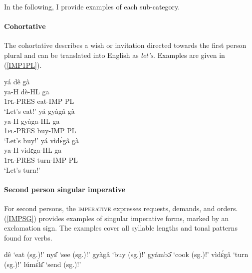 
\noindent In the following, I provide examples of each sub-category.

\paragraph{Cohortative}
The cohortative describes a wish or invitation directed towards the first person plural and can be translated into English as {\itshape let's}. Examples are given in (\ref{IMP1PL}).

\begin{exe}
\ex\label{IMP1PL}
\begin{xlist}
\ex 
  \glll yá dê gà \\
         ya-H dè-HL ga \\
         1\textsc{pl}-PRES eat-IMP PL\\
    \trans `Let's eat!' 
\ex 
  \glll yá gyàgâ gà \\
         ya-H gyàga-HL ga \\
         1\textsc{pl}-PRES buy-IMP PL\\
    \trans `Let's buy!' 
\ex 
  \glll yá vìdɛ́gâ gà \\
         ya-H vìdɛga-HL ga \\
         1\textsc{pl}-PRES turn-IMP PL\\
    \trans `Let's turn!'
\end{xlist}
\end{exe}





\paragraph{Second person singular imperative}
For second persons, the \textsc{imperative} expresses requests, demands, and orders. 
 (\ref{IMPSG}) provides examples of singular imperative forms, marked by an exclamation sign. The examples cover all syllable lengths and tonal patterns found for verbs.

\begin{exe}
\ex\label{IMPSG}
\begin{xlist}
\ex dê `eat (sg.)!'
\ex nyɛ̂ `see (sg.)!'
\ex gyàgâ `buy (sg.)!'
\ex gyámbɔ̂ `cook (sg.)!' 
\ex vìdɛ́gâ `turn (sg.)!' 
\ex lúmɛ́lɛ̂  `send (sg.)!' 
\end{xlist}
\end{exe}

